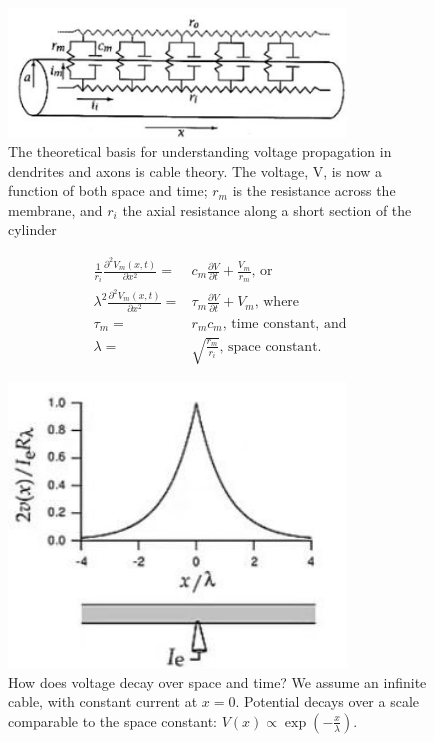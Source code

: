\documentclass[]{article}
\begin{document}
\begin{figure}[H]
	\caption[The theoretical basis for understanding voltage propagation]{The theoretical basis for understanding voltage propagation in dendrites and axons is cable theory. The voltage, V, is now a function of both space and time; $r_m$ is the resistance across the membrane, and $r_i$ the axial resistance along a short section of the cylinder\cite{Johnston1994}}
	\includegraphics[width=0.8\textwidth]{cable-theory}
\end{figure}

\begin{align*}
	\frac{1}{r_i}\frac{\partial^2V_m(x,t)}{\partial x^2} =& c_m \frac{\partial V}{\partial t} + \frac{V_m}{r_m}\text{, or} \\
	\lambda^2\frac{\partial^2V_m(x,t)}{\partial x^2} =& \tau_m \frac{\partial V}{\partial t} + V_m \text{, where}\\
	\tau_m =& r_m c_m \text{, time constant, and}\\
	\lambda =& \sqrt{\frac{r_m}{r_i}} \text{, space constant.}
\end{align*}


\begin{figure}[H]
	\caption[How does voltage decay over space and time?]{How does voltage decay over space and time? We assume an infinite cable, with constant current at $x=0$. Potential decays over a scale comparable to the space constant: $V(x)\propto \exp(-\frac{x}{\lambda})$.}
	\includegraphics[width=0.8\textwidth]{potential-decay-space}
\end{figure}
\end{document}
